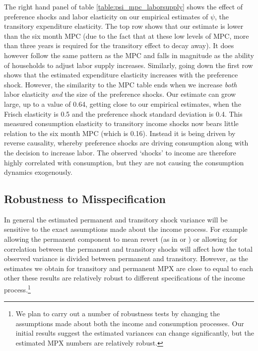 The right hand panel of table \ref{table:psi_mpc_laborsupply} shows the effect of preference shocks and labor elasticity on our empirical estimates of $\psi$, the transitory expenditure elasticity. The top row shows that our estimate is lower than the six month MPC (due to the fact that at these low levels of MPC, more than three years is required for the transitory effect to decay away). It does however follow the same pattern as the MPC and falls in magnitude as the ability of households to adjust labor supply increases. Similarly, going down the first row shows that the estimated expenditure elasticity increases with the preference shock. However, the similarity to the MPC table ends when we increase \textit{both} labor elasticity \textit{and} the size of the preference shocks. Our estimate can grow large, up to a value of 0.64, getting close to our empirical estimates, when the Frisch elasticity is 0.5 and the preference shock standard deviation is 0.4. This measured consumption elasticity to transitory income shocks now bears little relation to the six month MPC (which is 0.16). Instead it is being driven by reverse causality, whereby preference shocks are driving consumption along with the decision to increase labor. The observed `shocks' to income are therefore highly correlated with consumption, but they are not causing the consumption dynamics exogenously.


\subsection{Robustness to Misspecification} \label{misspecification}
In general the estimated permanent and transitory shock variance will be sensitive to the exact assumptions made about the income process. For example allowing the permanent component to mean revert (as in \cite{ahn_when_2017} or \cite{arellano_earnings_2017}) or allowing for correlation between the permanent and transitory shocks will affect how the total observed variance is divided between permanent and transitory. However, as the estimates we obtain for transitory and permanent MPX are close to equal to each other these results are relatively robust to different specifications of the income process.\footnote{We plan to carry out a number of robustness tests by changing the assumptions made about both the income and consumption processes. Our initial results suggest the estimated variances can change significantly, but the estimated MPX numbers are relatively robust.}

